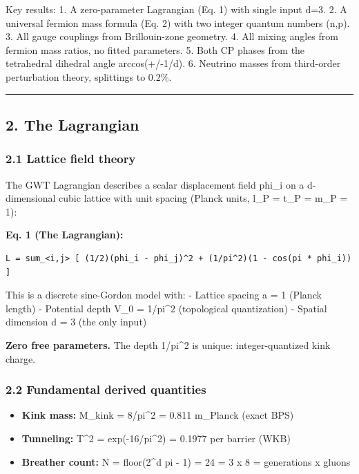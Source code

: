 \documentclass[
]{article}
\providecommand{\tightlist}{%
  \setlength{\itemsep}{0pt}\setlength{\parskip}{0pt}}
\begin{document}
Key results: 1. A zero-parameter Lagrangian (Eq. 1) with single input
d=3. 2. A universal fermion mass formula (Eq. 2) with two integer
quantum numbers (n,p). 3. All gauge couplings from Brillouin-zone
geometry. 4. All mixing angles from fermion mass ratios, no fitted
parameters. 5. Both CP phases from the tetrahedral dihedral angle
arccos(+/-1/d). 6. Neutrino masses from third-order perturbation theory,
splittings to 0.2\%.

\begin{center}\rule{0.5\linewidth}{0.5pt}\end{center}

\subsection{2. The Lagrangian}\label{the-lagrangian}

\subsubsection{2.1 Lattice field theory}\label{lattice-field-theory}

The GWT Lagrangian describes a scalar displacement field phi\_i on a
d-dimensional cubic lattice with unit spacing (Planck units, l\_P = t\_P
= m\_P = 1):

\textbf{Eq. 1 (The Lagrangian):}

\begin{verbatim}
L = sum_<i,j> [ (1/2)(phi_i - phi_j)^2 + (1/pi^2)(1 - cos(pi * phi_i)) ]
\end{verbatim}

This is a discrete sine-Gordon model with: - Lattice spacing a = 1
(Planck length) - Potential depth V\_0 = 1/pi\^{}2 (topological
quantization) - Spatial dimension d = 3 (the only input)

\textbf{Zero free parameters.} The depth 1/pi\^{}2 is unique:
integer-quantized kink charge.

\subsubsection{2.2 Fundamental derived
quantities}\label{fundamental-derived-quantities}

\begin{itemize}
\tightlist
\item
  \textbf{Kink mass:} M\_kink = 8/pi\^{}2 = 0.811 m\_Planck (exact BPS)
\item
  \textbf{Tunneling:} T\^{}2 = exp(-16/pi\^{}2) = 0.1977 per barrier
  (WKB)
\item
  \textbf{Breather count:} N = floor(2\^{}d pi - 1) = 24 = 3 x 8 =
  generations x gluons
\end{itemize}
\end{document}
